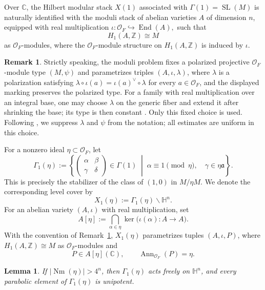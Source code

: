 \documentclass[12 pt]{amsart}
\newtheorem{Lemma}[theorem]{Lemma}
\theoremstyle{definition}
\newtheorem{Remark}[theorem]{Remark}
\newcommand{\Nm}{\operatorname{Nm}}
\newcommand{\Hu}{\mathbb{H}}
\begin{document}
Over \(\mathbb C\), the Hilbert modular stack \(X(1)\) associated with
\(\Gamma(1)=\operatorname{SL}(M)\) is naturally identified with the
moduli stack of abelian varieties \(A\) of dimension \(n\), equipped
with real multiplication
\(
\iota:\mathcal O_F\hookrightarrow\operatorname{End}(A),
\)
such that
\[
H_1(A,\mathbb Z)\cong M
\]
as \(\mathcal O_F\)-modules, where the \(\mathcal O_F\)-module structure
on \(H_1(A,\mathbb Z)\) is induced by \(\iota\).

\begin{Remark}\label{polarization-data}
Strictly speaking, the moduli problem fixes a polarized projective \(\mathcal O_F\)-module type \((M,\psi)\) and parametrizes triples \((A,\iota,\lambda)\), where \(\lambda\) is a polarization satisfying \(\lambda\circ\iota(a)=\iota(a)^\vee\circ\lambda\) for every \(a\in\mathcal O_F\), and the displayed marking preserves the polarized type. For a family with real multiplication over an integral base, one may choose \(\lambda\) on the generic fiber and extend it after shrinking the base; its type is then constant \cite[Lemma~2.12 and Theorem~2.16]{goren2002lectures}. Only this fixed choice is used. Following \cite[\S~3]{bakker2018geometric}, we suppress \(\lambda\) and \(\psi\) from the notation; all estimates are uniform in this choice.
\end{Remark}


For a nonzero ideal $\eta\subset\mathcal O_F$, let
\[
\Gamma_1(\eta):=
\left\{
\begin{pmatrix}
\alpha&\beta\\
\gamma&\delta
\end{pmatrix}
\in\Gamma(1)
\;\middle|\;
\alpha\equiv1\pmod{\eta},\quad
\gamma\in\eta\mathfrak a
\right\}.
\]
This is precisely the stabilizer of the class of $(1,0)$ in $M/\eta M$. We denote the corresponding level cover by
\[
X_1(\eta):=\Gamma_1(\eta)\backslash\Hu^n.
\]
For an abelian variety \((A,\iota)\) with real multiplication, set
\[
A[\eta]
:=
\bigcap_{\alpha\in\eta}
\ker\bigl(\iota(\alpha):A\longrightarrow A\bigr).
\]
With the convention of Remark~\ref{polarization-data},
\(X_1(\eta)\) parametrizes tuples \((A,\iota,P)\), where
\(
H_1(A,\mathbb Z)\cong M
\)
as \(\mathcal O_F\)-modules and
\[
P\in A[\eta](\mathbb C),
\qquad
\operatorname{Ann}_{\mathcal O_F}(P)=\eta.
\]
\begin{Lemma}\label{no elliptic}
If \(|\Nm(\eta)|>4^n\), then \(\Gamma_1(\eta)\) acts freely on \(\mathbb H^n\), and every parabolic element of \(\Gamma_1(\eta)\) is unipotent.
\end{Lemma}
\end{document}
